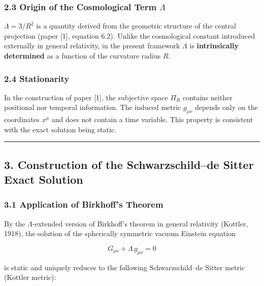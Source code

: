 \documentclass[a4paper,11pt]{article}
\theoremstyle{definition}
\begin{document}
\subsubsection{\texorpdfstring{2.3 Origin of the Cosmological Term
\(\Lambda\)}{2.3 Origin of the Cosmological Term \textbackslash Lambda}}\label{origin-of-the-cosmological-term-lambda}

\(\Lambda = 3/R^2\) is a quantity derived from the geometric structure
of the central projection (paper {[}1{]}, equation 6.2). Unlike the
cosmological constant introduced externally in general relativity, in
the present framework \(\Lambda\) is \textbf{intrinsically determined}
as a function of the curvature radius \(R\).

\subsubsection{2.4 Stationarity}\label{stationarity}

In the construction of paper {[}1{]}, the subjective space \(\Pi_R\)
contains neither positional nor temporal information. The induced metric
\(g_{\mu\nu}\) depends only on the coordinates \(x^\mu\) and does not
contain a time variable. This property is consistent with the exact
solution being static.

\begin{center}\rule{0.5\linewidth}{0.5pt}\end{center}

\subsection{3. Construction of the Schwarzschild--de Sitter Exact
Solution}\label{construction-of-the-schwarzschildde-sitter-exact-solution}

\subsubsection{3.1 Application of Birkhoff's
Theorem}\label{application-of-birkhoffs-theorem}

By the \(\Lambda\)-extended version of Birkhoff's theorem in general
relativity (Kottler, 1918), the solution of the spherically symmetric
vacuum Einstein equation

\[G_{\mu\nu} + \Lambda\, g_{\mu\nu} = 0 \tag{3.1}\]

is static and uniquely reduces to the following Schwarzschild--de Sitter
metric (Kottler metric):
\end{document}
